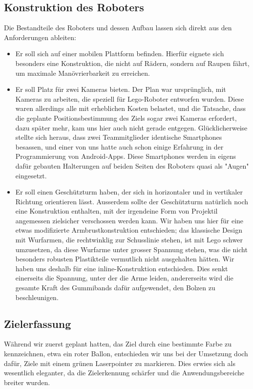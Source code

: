 \documentclass[12pt,a4paper]{article}
\begin{document}
\subsection{Konstruktion des Roboters}
Die Bestandteile des Roboters und dessen Aufbau lassen sich direkt aus den Anforderungen ableiten:
\begin{itemize}
\item
Er soll sich auf einer mobilen Plattform befinden. Hierfür eignete sich besonders eine 	Konstruktion, die nicht auf Rädern, sondern auf Raupen fährt, um maximale 	Manövrierbarkeit zu erreichen.
\item
Er soll Platz für zwei Kameras bieten. Der Plan war ursprünglich, mit Kameras zu arbeiten, die speziell für Lego-Roboter entworfen wurden. Diese waren allerdings alle mit erheblichen Kosten belastet, und die Tatsache, dass die geplante Positionsbestimmung des Ziels sogar zwei Kameras erfordert, dazu später mehr, kam uns hier auch nicht gerade entgegen. Glücklicherweise stellte sich heraus, dass zwei Teammitglieder identische Smartphones besassen, und einer von uns hatte auch schon einige Erfahrung in der Programmierung von Android-Apps. Diese 	Smartphones werden in eigens dafür gebauten Halterungen auf beiden Seiten des Roboters 	quasi als "Augen" eingesetzt.
\item
Er soll einen Geschützturm haben, der sich in horizontaler und in vertikaler Richtung orientieren lässt. Ausserdem sollte der Geschützturm natürlich noch eine Konstruktion 	enthalten, mit der irgendeine Form von Projektil angemessen zielsicher verschossen werden 	kann. Wir haben uns hier für eine etwas modifizierte Armbrustkonstruktion entschieden; das klassische Design mit Wurfarmen, die rechtwinklig zur Schusslinie stehen, ist mit Lego 	schwer umzusetzen, da diese Wurfarme unter grosser Spannung stehen, was die nicht besonders robusten Plastikteile vermutlich nicht ausgehalten hätten. Wir haben uns deshalb 	für eine inline-Konstruktion entschieden. Dies senkt einerseits die Spannung, unter der die Arme leiden, andererseits wird die gesamte Kraft des Gummibands dafür aufgewendet, den Bolzen zu beschleunigen.
\end{itemize}
\subsection{Zielerfassung}
Während wir zuerst geplant hatten, das Ziel durch eine bestimmte Farbe zu kennzeichnen, etwa ein roter Ballon, entschieden wir uns bei der Umsetzung doch dafür, Ziele mit einem grünen Laserpointer zu markieren. Dies erwies sich als wesentlich eleganter, da die Zielerkennung schärfer und die Anwendungsbereiche breiter wurden. 
\end{document}
